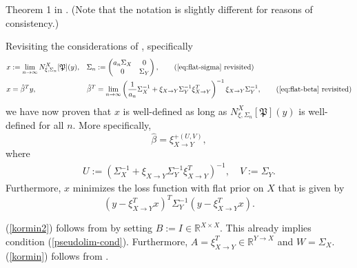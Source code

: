 \documentclass[a4paper,11pt]{report}
\begin{document}
\begin{Bew}
Theorem 1 in \cite{Ward1977}. (Note that the notation is slightly different for reasons of consistency.)
\end{Bew}

\begin{Cor}\label{the:flat}
Revisiting the considerations of , specifically
\begin{align}
x&:=\lim_{n\to\infty}N^X_{\xi,\Sigma_n}[\mathfrak{P}](y),
&
\Sigma_n&:=\begin{pmatrix}
a_n\Sigma_X&0\\
0&\Sigma_Y
\end{pmatrix},\tag{\ref{eq:flat-sigma} revisited}\\
x&=\hat{\beta}^Ty,
&
\hat{\beta}^T&=\lim_{n\to\infty}\left(\frac{1}{a_n}\Sigma_X^{-1}+\xi_{X\to Y}\Sigma_Y^{-1}\xi_{X\to Y}^T\right)^{-1}\xi_{X\to Y}\Sigma_Y^{-1},\tag{\ref{eq:flat-beta} revisited}
\end{align}
we have now proven that $x$ is well-defined as long as $N^X_{\xi,\Sigma_n}[\mathfrak{P}](y)$ is well-defined for all $n$. More specifically,
\begin{equation}\label{kormin2}
\hat{\beta}=\xi_{X\to Y}^{+(U,V)},
\end{equation}
where
\begin{align*}
U:=\left(\Sigma_X^{-1}+\xi_{X\to Y}\Sigma_Y^{-1}\xi_{X\to Y}^T\right)^{-1},
\quad
V:=\Sigma_Y.
\end{align*}
Furthermore, $x$ minimizes the loss function with flat prior on $X$ that is given by
\begin{equation}\label{kormin}
\left(y-\xi_{X\to Y}^Tx\right)^T\Sigma_Y^{-1}\left(y-\xi_{X\to Y}^Tx\right).
\end{equation}
\end{Cor}

\begin{Bew}
(\ref{kormin2}) follows from  by setting $B:=I\in\mathbb{R}^{X\times X}$. This already implies condition (\ref{pseudolim-cond}). Furthermore, $A=\xi_{X\to Y}^T\in\mathbb{R}^{Y\to X}$ and $W=\Sigma_X$. (\ref{kormin}) follows from .
\end{Bew}
\end{document}
